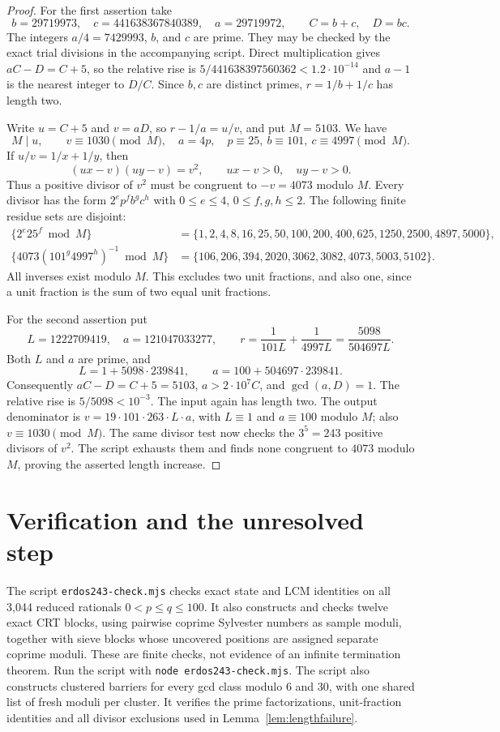 \documentclass[11pt]{article}
\begin{document}
\begin{proof}
For the first assertion take
\[
 b=29719973,\quad c=441638367840389,\quad a=29719972,
 \qquad C=b+c,\quad D=bc.
\]
The integers $a/4=7429993$, $b$, and $c$ are prime. They may be
checked by the exact trial divisions in the accompanying script.
Direct multiplication gives $aC-D=C+5$, so the relative rise is
$5/441638397560362<1.2\cdot10^{-14}$ and $a-1$ is the nearest integer
to $D/C$. Since $b,c$ are distinct primes, $r=1/b+1/c$ has length two.

Write $u=C+5$ and $v=aD$, so $r-1/a=u/v$, and put $M=5103$.
We have
\[
 M\mid u,\qquad v\equiv1030\pmod M,
 \quad a=4p,\quad p\equiv25,\ b\equiv101,\ c\equiv4997\pmod M.
\]
If $u/v=1/x+1/y$, then
\[
 (ux-v)(uy-v)=v^2,
 \qquad ux-v>0,\quad uy-v>0.
\]
Thus a positive divisor of $v^2$ must be congruent to $-v=4073$ modulo
$M$. Every divisor has the form $2^e p^f b^g c^h$ with
$0\le e\le4$, $0\le f,g,h\le2$. The following finite residue sets
are disjoint:
\begin{align*}
 \{2^e25^f\bmod M\}
 &=\{1,2,4,8,16,25,50,100,200,400,625,1250,2500,4897,5000\},\\
 \{4073(101^g4997^h)^{-1}\bmod M\}
 &=\{106,206,394,2020,3062,3082,4073,5003,5102\}.
\end{align*}
All inverses exist modulo $M$. This excludes two unit fractions,
and also one, since a unit fraction is the sum of two equal unit fractions.

For the second assertion put
\[
 L=1222709419,\quad a=121047033277,\qquad
 r=\frac1{101L}+\frac1{4997L}=\frac{5098}{504697L}.
\]
Both $L$ and $a$ are prime, and
\[
 L=1+5098\cdot239841,\qquad
 a=100+504697\cdot239841.
\]
Consequently $aC-D=C+5=5103$, $a>2\cdot10^7C$, and
$\gcd(a,D)=1$. The relative rise is $5/5098<10^{-3}$.
The input again has length two. The output denominator is
$v=19\cdot101\cdot263\cdot L\cdot a$, with $L\equiv1$ and
$a\equiv100$ modulo $M$; also $v\equiv1030\pmod M$.
The same divisor test now checks the $3^5=243$ positive divisors
of $v^2$. The script exhausts them and finds none congruent to $4073$
modulo $M$, proving the asserted length increase.
\end{proof}

\section{Verification and the unresolved step}
The script \texttt{erdos243-check.mjs} checks exact state and LCM identities
on all 3,044 reduced rationals $0<p\le q\le100$. It also constructs and
checks twelve exact CRT blocks, using pairwise coprime Sylvester numbers
as sample moduli, together with sieve blocks whose uncovered positions
are assigned separate coprime moduli. These are finite checks, not evidence of an infinite
termination theorem. Run the script with \texttt{node erdos243-check.mjs}.
The script also constructs clustered barriers for every gcd class
modulo $6$ and $30$, with one shared list of fresh moduli per cluster.
It verifies the prime factorizations, unit-fraction identities and all
divisor exclusions used in Lemma~\ref{lem:lengthfailure}.
\end{document}
